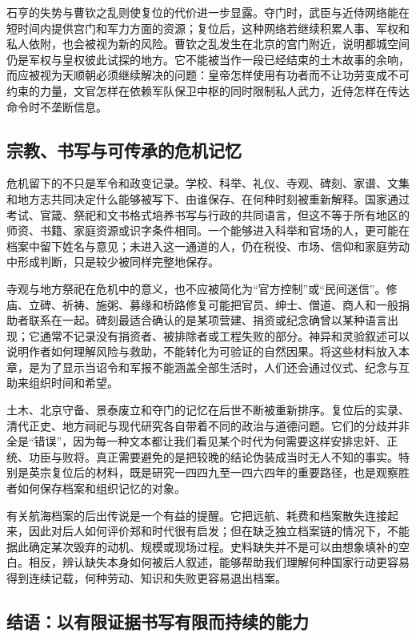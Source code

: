 石亨的失势与曹钦之乱则使复位的代价进一步显露。夺门时，武臣与近侍网络能在短时间内提供宫门和军力方面的资源；复位后，这种网络若继续积累人事、军权和私人依附，也会被视为新的风险。曹钦之乱发生在北京的宫门附近，说明都城空间仍是军权与皇权彼此试探的地方。它不能被当作一段已经结束的土木故事的余响，而应被视为天顺朝必须继续解决的问题：皇帝怎样使用有功者而不让功劳变成不可约束的力量，文官怎样在依赖军队保卫中枢的同时限制私人武力，近侍怎样在传达命令时不垄断信息。

\subsection{宗教、书写与可传承的危机记忆}

危机留下的不只是军令和政变记录。学校、科举、礼仪、寺观、碑刻、家谱、文集和地方志共同决定什么能够被写下、由谁保存、在何种时刻被重新解释。国家通过考试、官箴、祭祀和文书格式培养书写与行政的共同语言，但这不等于所有地区的师资、书籍、家庭资源或识字条件相同。一个能够进入科举和官场的人，更可能在档案中留下姓名与意见；未进入这一通道的人，仍在税役、市场、信仰和家庭劳动中形成判断，只是较少被同样完整地保存。

寺观与地方祭祀在危机中的意义，也不应被简化为“官方控制”或“民间迷信”。修庙、立碑、祈祷、施粥、募缘和桥路修复可能把官员、绅士、僧道、商人和一般捐助者联系在一起。碑刻最适合确认的是某项营建、捐资或纪念确曾以某种语言出现；它通常不记录没有捐资者、被排除者或工程失败的部分。神异和灵验叙述可以说明作者如何理解风险与救助，不能转化为可验证的自然因果。将这些材料放入本章，是为了显示当诏令和军报不能涵盖全部生活时，人们还会通过仪式、纪念与互助来组织时间和希望。

土木、北京守备、景泰废立和夺门的记忆在后世不断被重新排序。复位后的实录、清代正史、地方祠祀与现代研究各自带着不同的政治与道德问题。它们的分歧并非全是“错误”，因为每一种文本都让我们看见某个时代为何需要这样安排忠奸、正统、功臣与败将。真正需要避免的是把较晚的结论伪装成当时无人不知的事实。特别是英宗复位后的材料，既是研究一四四九至一四六四年的重要路径，也是观察胜者如何保存档案和组织记忆的对象。

有关航海档案的后出传说是一个有益的提醒。它把远航、耗费和档案散失连接起来，因此对后人如何评价郑和时代很有启发；但在缺乏独立档案链的情况下，不能据此确定某次毁弃的动机、规模或现场过程。史料缺失并不是可以由想象填补的空白。相反，辨认缺失本身如何被后人叙述，能够帮助我们理解何种国家行动更容易得到连续记载，何种劳动、知识和失败更容易退出档案。

\subsection{结语：以有限证据书写有限而持续的能力}


